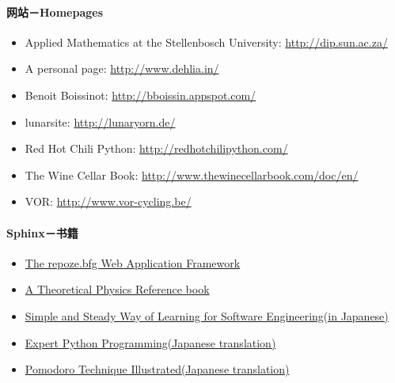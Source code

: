 \documentclass[letterpaper,10pt,english]{sphinxmanual}
\begin{document}
\paragraph{网站－Homepages}
\label{jupyter/sphinx_quickstart:_u7f51_u7ad9_uff0dHomepages}\begin{itemize}
\item {} 
Applied Mathematics at the Stellenbosch University:
\url{http://dip.sun.ac.za/}

\item {} 
A personal page: \url{http://www.dehlia.in/}

\item {} 
Benoit Boissinot: \url{http://bboissin.appspot.com/}

\item {} 
lunarsite: \url{http://lunaryorn.de/}

\item {} 
Red Hot Chili Python: \url{http://redhotchilipython.com/}

\item {} 
The Wine Cellar Book: \url{http://www.thewinecellarbook.com/doc/en/}

\item {} 
VOR: \url{http://www.vor-cycling.be/}

\end{itemize}


\paragraph{Sphinx－书籍}
\label{jupyter/sphinx_quickstart:Sphinx_uff0d_u4e66_u7c4d}\begin{itemize}
\item {} 
\href{http://www.amazon.com/repoze-bfg-Web-Application-Framework-Version/dp/0615345379}{The repoze.bfg Web Application
Framework}

\item {} 
\href{http://theoretical-physics.net/}{A Theoretical Physics Reference
book}

\item {} 
\href{http://www.amazon.co.jp/dp/477414259X/}{Simple and Steady Way of Learning for Software Engineering(in
Japanese)}

\item {} 
\href{http://www.amazon.co.jp/dp/4048686291/}{Expert Python Programming(Japanese
translation)}

\item {} 
\href{http://www.amazon.co.jp/dp/4048689525/}{Pomodoro Technique Illustrated(Japanese
translation)}

\end{itemize}
\end{document}
